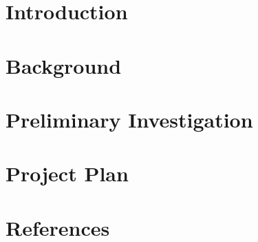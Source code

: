 





\section{Introduction}




\section{Background}



\section{Preliminary Investigation}



\section{Project Plan}




\newpage

\section{References}

\printbibliography[heading=none]




